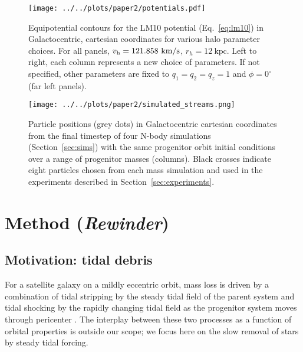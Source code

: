 \documentclass[letterpaper,12pt,preprint]{aastex}
\newcommand{\vhalo}{v_{\rm h}}
\newcommand{\rewinder}{\emph{Rewinder}}
\begin{document}
\begin{figure}[h]
\begin{center}
\texttt{[image: ../../plots/paper2/potentials.pdf]}
\caption{ Equipotential contours for the LM10 potential (Eq.~\ref{eq:lm10}) in Galactocentric, cartesian coordinates for various halo parameter choices. For all panels, $\vhalo=121.858~\mathrm{km}/\mathrm{s}$, $r_h=12~\mathrm{kpc}$. Left to right, each column represents a new choice of parameters. If not specified, other parameters are fixed to $q_1=q_2=q_z=1$ and $\phi=0^\circ$ (far left panels).  }\label{fig:potential}
\end{center}
\end{figure}

\begin{figure}[h]
\begin{center}
\texttt{[image: ../../plots/paper2/simulated\_streams.png]}
\caption{ Particle positions (grey dots) in Galactocentric cartesian coordinates from the final timestep of four N-body simulations (Section~\ref{sec:sims}) with the same progenitor orbit initial conditions over a range of progenitor masses (columns). Black crosses indicate eight particles chosen from each mass simulation and used in the experiments described in Section~\ref{sec:experiments}.}\label{fig:sims}
\end{center}
\end{figure}

\section{Method (\rewinder)}

\subsection{Motivation: tidal debris}\label{sec:debris}

For a satellite galaxy on a mildly eccentric orbit, mass loss is driven by a combination of tidal stripping by the steady tidal field of the parent system and tidal shocking by the rapidly changing tidal field as the progenitor system moves through pericenter \citep[e.g.,][]{choi09}. The interplay between these two processes as a function of orbital properties is outside our scope; we focus here on the slow removal of stars by steady tidal forcing. 
\end{document}
